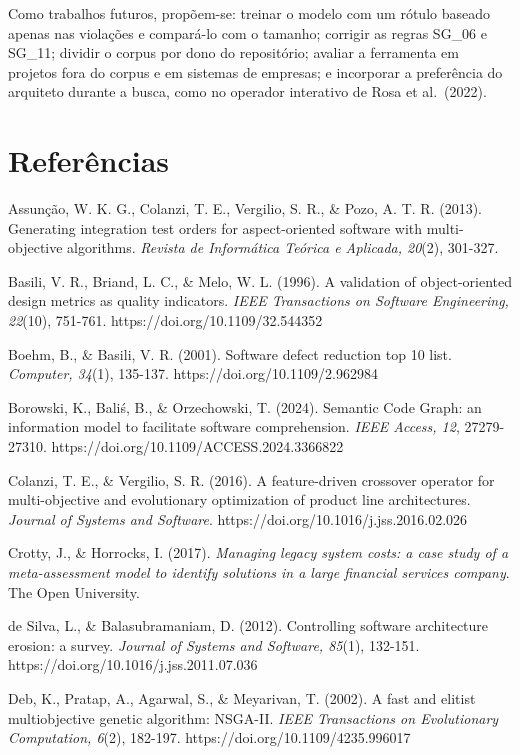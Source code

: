 \documentclass[
  a4paper,
]{article}
\begin{document}
Como trabalhos futuros, propõem-se: treinar o modelo com um rótulo baseado apenas nas violações e compará-lo com o tamanho; corrigir as regras SG\_06 e SG\_11; dividir o corpus por dono do repositório; avaliar a ferramenta em projetos fora do corpus e em sistemas de empresas; e incorporar a preferência do arquiteto durante a busca, como no operador interativo de Rosa et al.~(2022).

\hypertarget{referuxeancias}{%
\section{Referências}\label{referuxeancias}}

Assunção, W. K. G., Colanzi, T. E., Vergilio, S. R., \& Pozo, A. T. R. (2013). Generating integration test orders for aspect-oriented software with multi-objective algorithms. \emph{Revista de Informática Teórica e Aplicada, 20}(2), 301-327.

Basili, V. R., Briand, L. C., \& Melo, W. L. (1996). A validation of object-oriented design metrics as quality indicators. \emph{IEEE Transactions on Software Engineering, 22}(10), 751-761. https://doi.org/10.1109/32.544352

Boehm, B., \& Basili, V. R. (2001). Software defect reduction top 10 list. \emph{Computer, 34}(1), 135-137. https://doi.org/10.1109/2.962984

Borowski, K., Baliś, B., \& Orzechowski, T. (2024). Semantic Code Graph: an information model to facilitate software comprehension. \emph{IEEE Access, 12}, 27279-27310. https://doi.org/10.1109/ACCESS.2024.3366822

Colanzi, T. E., \& Vergilio, S. R. (2016). A feature-driven crossover operator for multi-objective and evolutionary optimization of product line architectures. \emph{Journal of Systems and Software}. https://doi.org/10.1016/j.jss.2016.02.026

Crotty, J., \& Horrocks, I. (2017). \emph{Managing legacy system costs: a case study of a meta-assessment model to identify solutions in a large financial services company}. The Open University.

de Silva, L., \& Balasubramaniam, D. (2012). Controlling software architecture erosion: a survey. \emph{Journal of Systems and Software, 85}(1), 132-151. https://doi.org/10.1016/j.jss.2011.07.036

Deb, K., Pratap, A., Agarwal, S., \& Meyarivan, T. (2002). A fast and elitist multiobjective genetic algorithm: NSGA-II. \emph{IEEE Transactions on Evolutionary Computation, 6}(2), 182-197. https://doi.org/10.1109/4235.996017
\end{document}
